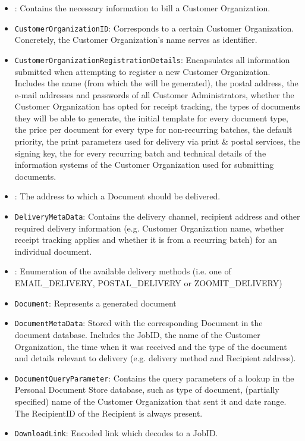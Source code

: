 \begin{itemize}
	\item {}: Contains the necessary information to bill a Customer Organization.
	\item \texttt{CustomerOrganizationID}: Corresponds to a certain Customer Organization. Concretely, the Customer Organization's name serves as identifier.
	\item \texttt{CustomerOrganizationRegistrationDetails}: Encapsulates all information submitted when attempting to register a new Customer Organization. Includes the name (from which the  will be generated), the postal address, the e-mail addresses and passwords of all Customer Administrators, whether the Customer Organization has opted for receipt tracking, the types of documents they will be able to generate, the initial template for every document type, the price per document for every type for non-recurring batches, the default priority, the print parameters used for delivery via print \& postal services, the signing key, the  for every recurring batch and technical details of the information systems of the Customer Organization used for submitting documents.
	\item {}: The address to which a Document should be delivered.
	\item \texttt{DeliveryMetaData}: Contains the delivery channel, recipient address and other required delivery information (e.g. Customer Organization name, whether receipt tracking applies and whether it is from a recurring batch) for an individual document.
	\item {}: Enumeration of the available delivery methods (i.e. one of EMAIL\_DELIVERY, POSTAL\_DELIVERY or ZOOMIT\_DELIVERY)
	\item \texttt{Document}: Represents a generated document
	\item \texttt{DocumentMetaData}: Stored with the corresponding Document in the document database. Includes the JobID, the name of the Customer Organization, the time when it was received and the type of the document and details relevant to delivery (e.g. delivery method and Recipient address).
	\item \texttt{DocumentQueryParameter}: Contains the query parameters of a lookup in the Personal Document Store database, such as type of document, (partially specified) name of the Customer Organization that sent it and date range. The RecipientID of the Recipient is always present.
	\item \texttt{DownloadLink}: Encoded link which decodes to a JobID.

\end{itemize}
